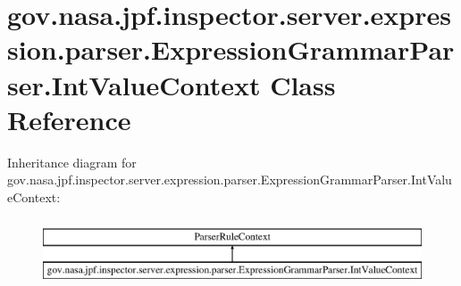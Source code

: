 \hypertarget{classgov_1_1nasa_1_1jpf_1_1inspector_1_1server_1_1expression_1_1parser_1_1_expression_grammar_parser_1_1_int_value_context}{}\section{gov.\+nasa.\+jpf.\+inspector.\+server.\+expression.\+parser.\+Expression\+Grammar\+Parser.\+Int\+Value\+Context Class Reference}
\label{classgov_1_1nasa_1_1jpf_1_1inspector_1_1server_1_1expression_1_1parser_1_1_expression_grammar_parser_1_1_int_value_context}
Inheritance diagram for gov.\+nasa.\+jpf.\+inspector.\+server.\+expression.\+parser.\+Expression\+Grammar\+Parser.\+Int\+Value\+Context\+:\begin{figure}[H]
\begin{center}
\leavevmode
\includegraphics[height=2.000000cm]{classgov_1_1nasa_1_1jpf_1_1inspector_1_1server_1_1expression_1_1parser_1_1_expression_grammar_parser_1_1_int_value_context}
\end{center}
\end{figure}
